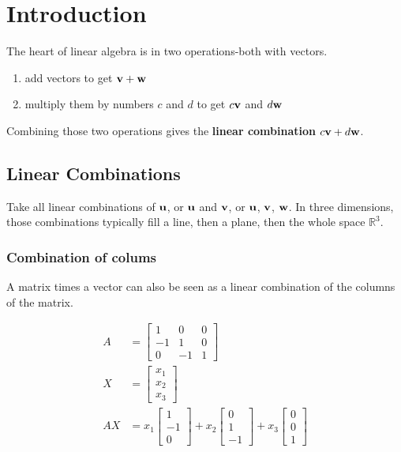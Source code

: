 \chapter{Introduction}

The heart of linear algebra is in two operations-both with vectors.
\begin{enumerate}
  \item add vectors to get $\textbf v + \textbf w$
  \item multiply them by numbers $c$ and $d$ to get $c \textbf v$ and $d \textbf w$
\end{enumerate}
Combining those two operations gives the \textbf{linear combination} $c\textbf v + d \textbf w$.

\section{Linear Combinations}

Take all linear combinations of $\textbf u$, or $\textbf u$ and $\textbf v$, or $\textbf u$, $\textbf v$, $\textbf w$. In three dimensions, those combinations typically fill a line, then a plane, then the whole space $\mathbb{R}^3$.

\subsection{Combination of colums}
A matrix times a vector can also be seen as a linear combination of the columns of the matrix.

\begin{align*}
  A &= \begin{bmatrix} 1 & 0 & 0 \\ -1 & 1 & 0 \\ 0 & -1 & 1 \end{bmatrix} \\
  X &= \begin{bmatrix} x_1 \\ x_2 \\ x_3 \end{bmatrix} \\
  AX &= x_1 \begin{bmatrix} 1 \\ -1 \\ 0 \end{bmatrix} 
     + x_2 \begin{bmatrix} 0 \\ 1 \\ -1 \end{bmatrix}
     + x_3 \begin{bmatrix} 0 \\ 0 \\ 1 \end{bmatrix}
\end{align*}